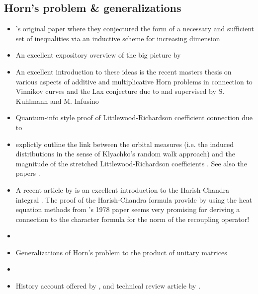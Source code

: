 \documentclass[notitlepage, 10pt]{article}
\begin{document}
\subsection{Horn's problem \& generalizations}
\begin{itemize}
     \item {}'s original paper where they conjectured the form of a necessary and sufficient set of inequalities via an inductive scheme for increasing dimension \cite{horn1962eigenvalues}
    \item An excellent expository overview of the big picture by \citeauthor{knutson2000symplectic} \cite{knutson2000symplectic}
    \item An excellent introduction to these ideas is the recent masters thesis on various aspects of additive and multiplicative Horn problems in connection to Vinnikov curves and the Lax conjecture due to \citeauthor{hess2020examination} and supervised by S. Kuhlmann and M. Infusino \cite{hess2020examination}
    \item Quantum-info style proof of Littlewood-Richardson coefficient connection due to \citeauthor{christandl2008quantum} \cite{christandl2008quantum}
    \item {} explictly outline the link between the orbital measures (i.e. the induced distributions in the sense of Klyachko's random walk approach) and the magnitude of the stretched Littlewood-Richardson coefficients \cite{coquereaux2018orbital}. See also the papers \cite{coquereaux2020horn,coquereaux2019revisiting,zuber2018horn}.
    \item A recent article by \citeauthor{mcswiggen2021harish} is an excellent introduction to the Harish-Chandra integral \cite{mcswiggen2021harish}. The proof of the Harish-Chandra formula provide by \citeauthor{mcswiggen2021harish} using the heat equation methods from \citeauthor{fegan1978heat}'s 1978 paper \cite{fegan1978heat} seems very promising for deriving a connection to the character formula for the norm of the recoupling operator!
    \item \citeauthor{speyer2005horn} \cite{speyer2005horn}
    \item Generalizations of Horn's problem to the product of unitary matrices \cite{agnihotri1997eigenvalues,belkale2008quantum,belkale2016multiplicative}
    \item \citeauthor{bhatia2001linear} \cite{bhatia2001linear}
    \item History account offered by \citeauthor{daftuar2005quantum} \cite{daftuar2005quantum}, and technical review article by \citeauthor{fulton2000eigenvalues} \cite{fulton2000eigenvalues}.

\end{itemize}
\end{document}
